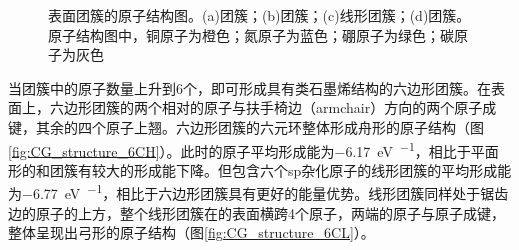 \begin{figure}[htb]
{            \label{fig:CG_structure_5C}
        }
        \caption{表面团簇的原子结构图。(a)团簇；(b)团簇；(c)线形团簇；(d)团簇。原子结构图中，铜原子为橙色；氮原子为蓝色；硼原子为绿色；碳原子为灰色}
        \label{fig:CG_structure_3-5C}
    \end{figure}

    当团簇中的原子数量上升到6个，即可形成具有类石墨烯结构的六边形团簇。在表面上，六边形团簇的两个相对的原子与扶手椅边（armchair）方向的两个原子成键，其余的四个原子上翘。六边形团簇的六元环整体形成舟形的原子结构（图\ref{fig:CG_structure_6CH}）。此时的原子平均形成能为\SI{-6.17}{\electronvolt\per\atom}，相比于平面形的和团簇有较大的形成能下降。但包含六个sp杂化原子的线形团簇的平均形成能为\SI{-6.77}{\electronvolt\per\atom}，相比于六边形团簇具有更好的能量优势。线形团簇同样处于锯齿边的原子的上方，整个线形团簇在的表面横跨4个原子，两端的原子与原子成键，整体呈现出弓形的原子结构（图\ref{fig:CG_structure_6CL}）。

